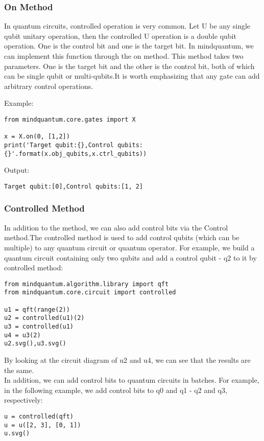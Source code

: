 \subsubsection{On Method}
In quantum circuits, controlled operation is very common. Let U be any single qubit unitary operation, then the controlled U operation is a double qubit operation. One is the control bit and one is the target bit. In mindquantum, we can implement this function through the on method. This method takes two parameters. One is the target bit and the other is the control bit, both of which can be single qubit or multi-qubits.It is worth emphasizing that any gate can add arbitrary control operations.

Example:
\begin{lstlisting}
from mindquantum.core.gates import X

x = X.on(0, [1,2])
print('Target qubit:{},Control qubits:{}'.format(x.obj_qubits,x.ctrl_qubits))
\end{lstlisting}
Output:
\begin{lstlisting}
Target qubit:[0],Control qubits:[1, 2]
\end{lstlisting}

\subsubsection{Controlled Method}
In addition to the  method, we can also add control bits via the Control method.The controlled method is used to add control qubits (which can be multiple) to any quantum circuit or quantum operator. For example, we build a quantum circuit containing only two qubits and add a control qubit - q2 to it by controlled method:
\begin{lstlisting}
from mindquantum.algorithm.library import qft
from mindquantum.core.circuit import controlled

u1 = qft(range(2))
u2 = controlled(u1)(2)
u3 = controlled(u1)
u4 = u3(2)
u2.svg(),u3.svg()
\end{lstlisting}
By looking at the circuit diagram of u2 and u4, we can see that the results are the same.\\
In addition, we can add control bits to quantum circuits in batches. For example, in the following example, we add control bits to q0 and q1 - q2 and q3, respectively:
\begin{lstlisting}
u = controlled(qft)
u = u([2, 3], [0, 1])
u.svg()
\end{lstlisting}

% 
